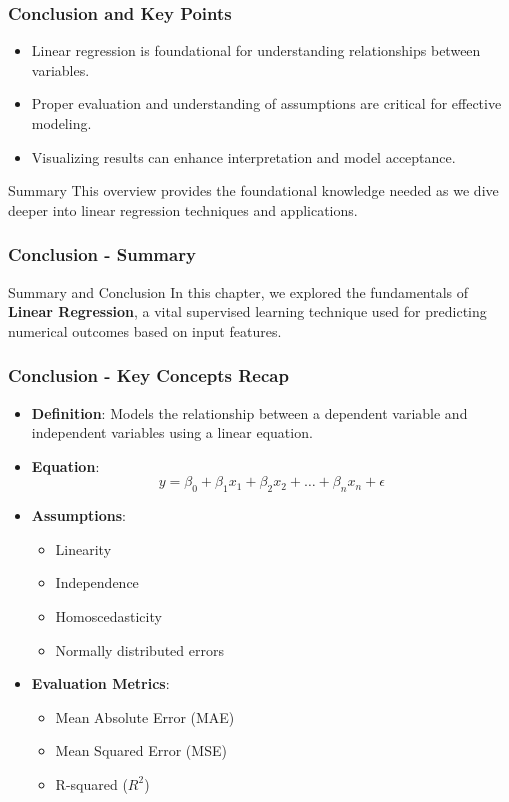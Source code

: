 \documentclass[aspectratio=169]{beamer}
\begin{document}
\begin{frame}[fragile]
    \frametitle{Conclusion and Key Points}
    \begin{itemize}
        \item Linear regression is foundational for understanding relationships between variables.
        \item Proper evaluation and understanding of assumptions are critical for effective modeling.
        \item Visualizing results can enhance interpretation and model acceptance.
    \end{itemize}
    \begin{block}{Summary}
        This overview provides the foundational knowledge needed as we dive deeper into linear regression techniques and applications.
    \end{block}
\end{frame}

\begin{frame}[fragile]
    \frametitle{Conclusion - Summary}
    \begin{block}{Summary and Conclusion}
        In this chapter, we explored the fundamentals of \textbf{Linear Regression}, a vital supervised learning technique used for predicting numerical outcomes based on input features.
    \end{block}
\end{frame}

\begin{frame}[fragile]
    \frametitle{Conclusion - Key Concepts Recap}
    \begin{itemize}
        \item \textbf{Definition}: Models the relationship between a dependent variable and independent variables using a linear equation.
        \item \textbf{Equation}:
        \begin{equation}
        y = \beta_0 + \beta_1 x_1 + \beta_2 x_2 + \ldots + \beta_n x_n + \epsilon
        \end{equation}
        \item \textbf{Assumptions}:
        \begin{itemize}
            \item Linearity
            \item Independence
            \item Homoscedasticity
            \item Normally distributed errors
        \end{itemize}
        \item \textbf{Evaluation Metrics}:
        \begin{itemize}
            \item Mean Absolute Error (MAE)
            \item Mean Squared Error (MSE)
            \item R-squared (\(R^2\))
        \end{itemize}
    \end{itemize}
\end{frame}
\end{document}
